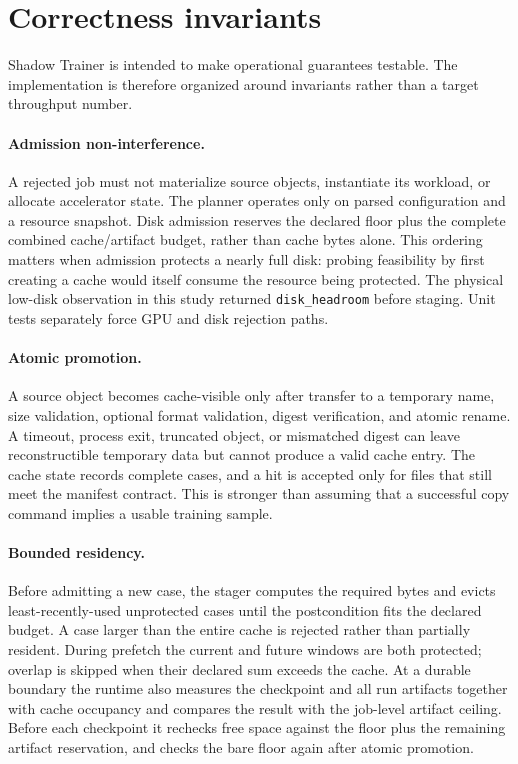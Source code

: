 \section{Correctness invariants}

Shadow Trainer is intended to make operational guarantees testable. The
implementation is therefore organized around invariants rather than a target
throughput number.

\paragraph{Admission non-interference.}
A rejected job must not materialize source objects, instantiate its workload,
or allocate accelerator state. The planner operates only on parsed configuration
and a resource snapshot. Disk admission reserves the declared floor plus
the complete combined cache/artifact budget, rather than cache bytes alone. This ordering matters when admission protects a nearly
full disk: probing feasibility by first creating a cache would itself consume
the resource being protected. The physical low-disk observation in this study
returned \texttt{disk\_headroom} before staging. Unit tests separately force
GPU and disk rejection paths.

\paragraph{Atomic promotion.}
A source object becomes cache-visible only after transfer to a temporary name,
size validation, optional format validation, digest verification, and atomic
rename. A timeout, process exit, truncated object, or mismatched digest can
leave reconstructible temporary data but cannot produce a valid cache entry.
The cache state records complete cases, and a hit is accepted only for files
that still meet the manifest contract. This is stronger than assuming that a
successful copy command implies a usable training sample.

\paragraph{Bounded residency.}
Before admitting a new case, the stager computes the required bytes and evicts
least-recently-used unprotected cases until the postcondition fits the declared
budget. A case larger than the entire cache is rejected rather than partially
resident. During prefetch the current and future windows are both protected;
overlap is skipped when their declared sum exceeds the cache. At a durable
boundary the runtime also measures the checkpoint and all run artifacts together
with cache occupancy and compares the result with the job-level artifact ceiling. Before each checkpoint it rechecks free space against the floor plus the
remaining artifact reservation, and checks the bare floor again after atomic
promotion.

